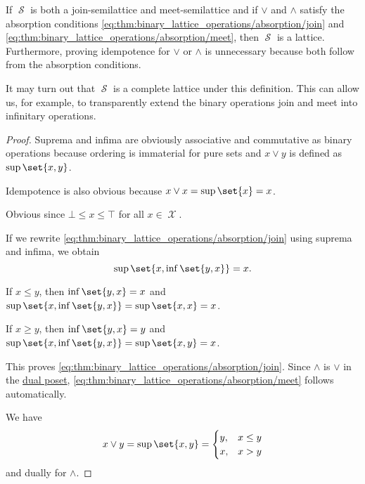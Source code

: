 \begin{proposition}
\begin{thmenum}
    If \( \mscrS \) is both a join-semilattice and meet-semilattice and if \( \vee \) and \( \wedge \) satisfy the absorption conditions \eqref{eq:thm:binary_lattice_operations/absorption/join} and \eqref{eq:thm:binary_lattice_operations/absorption/meet}, then \( \mscrS \) is a lattice. Furthermore, proving idempotence for \( \vee \) or \( \wedge \) is unnecessary because both follow from the absorption conditions.

    It may turn out that \( \mscrS \) is a complete lattice under this definition. This can allow us, for example, to transparently extend the binary operations join and meet into infinitary operations.
  \end{thmenum}
\end{proposition}
\begin{proof}
   Suprema and infima are obviously associative and commutative as binary operations because ordering is immaterial for pure sets and \( x \vee y \) is defined as \( \sup\set{ x, y } \).

  Idempotence is also obvious because \( x \vee x = \sup\set{ x } = x \).

   Obvious since \( \bot \leq x \leq \top \) for all \( x \in \mscrX \).

   If we rewrite \eqref{eq:thm:binary_lattice_operations/absorption/join} using suprema and infima, we obtain
  \begin{equation*}
    \sup\set{ x, \inf\set{ y, x } } = x.
  \end{equation*}

  If \( x \leq y \), then \( \inf\set{ y, x } = x \) and \( \sup\set{ x, \inf\set{ y, x } } = \sup\set{ x, x } = x \).

  If \( x \geq y \), then \( \inf\set{ y, x } = y \) and \( \sup\set{ x, \inf\set{ y, x } } = \sup\set{ x, y } = x \).

  This proves \eqref{eq:thm:binary_lattice_operations/absorption/join}. Since \( \wedge \) is \( \vee \) in the \hyperref[def:preordered_set/dual]{dual poset}, \eqref{eq:thm:binary_lattice_operations/absorption/meet} follows automatically.

   We have
  \begin{equation*}
    x \vee y
    =
    \sup\set{ x, y }
    =
    \begin{cases}
      y, &x \leq y \\
      x, &x > y
    \end{cases}
  \end{equation*}
  and dually for \( \wedge \).


\end{proof}

